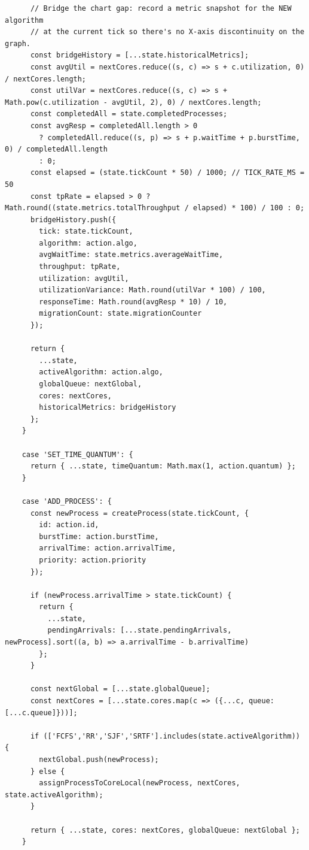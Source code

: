 \documentclass[a4paper]{article}
\begin{document}
\begin{lstlisting}
      // Bridge the chart gap: record a metric snapshot for the NEW algorithm
      // at the current tick so there's no X-axis discontinuity on the graph.
      const bridgeHistory = [...state.historicalMetrics];
      const avgUtil = nextCores.reduce((s, c) => s + c.utilization, 0) / nextCores.length;
      const utilVar = nextCores.reduce((s, c) => s + Math.pow(c.utilization - avgUtil, 2), 0) / nextCores.length;
      const completedAll = state.completedProcesses;
      const avgResp = completedAll.length > 0
        ? completedAll.reduce((s, p) => s + p.waitTime + p.burstTime, 0) / completedAll.length
        : 0;
      const elapsed = (state.tickCount * 50) / 1000; // TICK_RATE_MS = 50
      const tpRate = elapsed > 0 ? Math.round((state.metrics.totalThroughput / elapsed) * 100) / 100 : 0;
      bridgeHistory.push({
        tick: state.tickCount,
        algorithm: action.algo,
        avgWaitTime: state.metrics.averageWaitTime,
        throughput: tpRate,
        utilization: avgUtil,
        utilizationVariance: Math.round(utilVar * 100) / 100,
        responseTime: Math.round(avgResp * 10) / 10,
        migrationCount: state.migrationCounter
      });

      return {
        ...state,
        activeAlgorithm: action.algo,
        globalQueue: nextGlobal,
        cores: nextCores,
        historicalMetrics: bridgeHistory
      };
    }
    
    case 'SET_TIME_QUANTUM': {
      return { ...state, timeQuantum: Math.max(1, action.quantum) };
    }

    case 'ADD_PROCESS': {
      const newProcess = createProcess(state.tickCount, {
        id: action.id,
        burstTime: action.burstTime,
        arrivalTime: action.arrivalTime,
        priority: action.priority
      });
      
      if (newProcess.arrivalTime > state.tickCount) {
        return {
          ...state,
          pendingArrivals: [...state.pendingArrivals, newProcess].sort((a, b) => a.arrivalTime - b.arrivalTime)
        };
      } 

      const nextGlobal = [...state.globalQueue];
      const nextCores = [...state.cores.map(c => ({...c, queue: [...c.queue]}))];
      
      if (['FCFS','RR','SJF','SRTF'].includes(state.activeAlgorithm)) {
        nextGlobal.push(newProcess);
      } else {
        assignProcessToCoreLocal(newProcess, nextCores, state.activeAlgorithm);
      }
      
      return { ...state, cores: nextCores, globalQueue: nextGlobal };
    }


\end{lstlisting}
\end{document}
